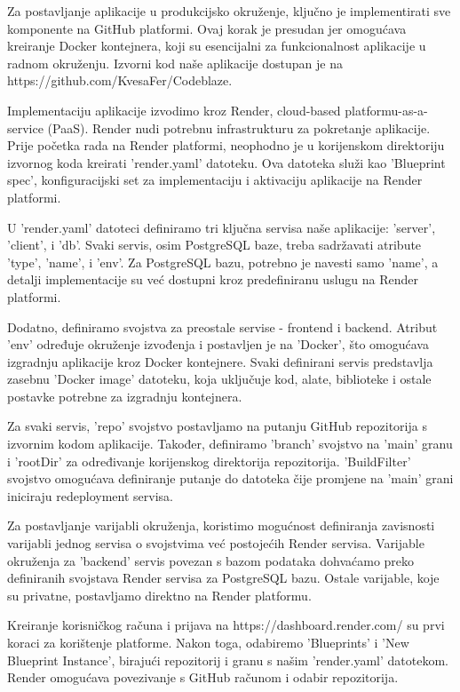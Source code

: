 		Za postavljanje aplikacije u produkcijsko okruženje, ključno je implementirati sve komponente na GitHub platformi. Ovaj korak je presudan jer omogućava kreiranje Docker kontejnera, koji su esencijalni za funkcionalnost aplikacije u radnom okruženju. Izvorni kod naše aplikacije dostupan je na https://github.com/KvesaFer/Codeblaze.

		Implementaciju aplikacije izvodimo kroz Render, cloud-based platformu-as-a-service (PaaS). Render nudi potrebnu infrastrukturu za pokretanje aplikacije. Prije početka rada na Render platformi, neophodno je u korijenskom direktoriju izvornog koda kreirati 'render.yaml' datoteku. Ova datoteka služi kao 'Blueprint spec', konfiguracijski set za implementaciju i aktivaciju aplikacije na Render platformi.

		U 'render.yaml' datoteci definiramo tri ključna servisa naše aplikacije: 'server', 'client', i 'db'. Svaki servis, osim PostgreSQL baze, treba sadržavati atribute 'type', 'name', i 'env'. Za PostgreSQL bazu, potrebno je navesti samo 'name', a detalji implementacije su već dostupni kroz predefiniranu uslugu na Render platformi.

		Dodatno, definiramo svojstva za preostale servise - frontend i backend. Atribut 'env' određuje okruženje izvođenja i postavljen je na 'Docker', što omogućava izgradnju aplikacije kroz Docker kontejnere. Svaki definirani servis predstavlja zasebnu 'Docker image' datoteku, koja uključuje kod, alate, biblioteke i ostale postavke potrebne za izgradnju kontejnera.

		Za svaki servis, 'repo' svojstvo postavljamo na putanju GitHub repozitorija s izvornim kodom aplikacije. Također, definiramo 'branch' svojstvo na 'main' granu i 'rootDir' za određivanje korijenskog direktorija repozitorija. 'BuildFilter' svojstvo omogućava definiranje putanje do datoteka čije promjene na 'main' grani iniciraju redeployment servisa.

		Za postavljanje varijabli okruženja, koristimo mogućnost definiranja zavisnosti varijabli jednog servisa o svojstvima već postojećih Render servisa. Varijable okruženja za 'backend' servis povezan s bazom podataka dohvaćamo preko definiranih svojstava Render servisa za PostgreSQL bazu. Ostale varijable, koje su privatne, postavljamo direktno na Render platformu.

		Kreiranje korisničkog računa i prijava na https://dashboard.render.com/ su prvi koraci za korištenje platforme. Nakon toga, odabiremo 'Blueprints' i 'New Blueprint Instance', birajući repozitorij i granu s našim 'render.yaml' datotekom. Render omogućava povezivanje s GitHub računom i odabir repozitorija.

